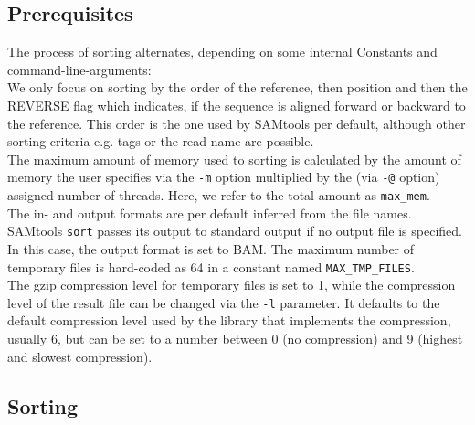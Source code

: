 \subsection{Prerequisites}
The process of sorting alternates, depending on some internal Constants and command-line-arguments: \\
We only focus on sorting by the order of the reference, then position and then the REVERSE flag which indicates, if the sequence is aligned forward or backward to the reference. This order is the one used by SAMtools per default, although other sorting criteria e.g. tags or the read name are possible.\\
The maximum amount of memory used to sorting is calculated by the amount of memory the user specifies via the \texttt{-m} option multiplied by the (via \texttt{-@} option) assigned number of threads. Here, we refer to the total amount as \texttt{max\_mem}. \\
The in- and output formats are per default inferred from the file names. \\
SAMtools \texttt{sort} passes its output to standard output if no output file is specified. In this case, the output format is set to BAM.
The maximum number of temporary files is hard-coded as 64 in a constant named \texttt{MAX\_TMP\_FILES}. \\
The gzip compression level for temporary files is set to 1, while the compression level of the result file can be changed via the \texttt{-l} parameter. It defaults to the default compression level used by the library that implements the compression, usually 6, but can be set to a number between 0 (no compression) and 9 (highest and slowest compression).

\subsection{Sorting} \label{sorting}

